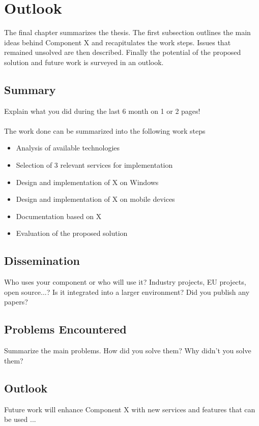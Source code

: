 \chapter{Outlook\label{cha:chapter7}}
The final chapter summarizes the thesis. The first subsection outlines the main ideas behind Component X and recapitulates the work steps. Issues that remained unsolved are then described. Finally the potential of the proposed solution and future work is surveyed in an outlook.

\section{Summary\label{sec:summary}}

Explain what you did during the last 6 month on 1 or 2 pages!
\\
\\
\noindent The work done can be summarized into the following work steps

\begin{itemize}
		\item Analysis of available technologies
		\vspace{-0.11in} 
		\item Selection of 3 relevant services for implementation
		\vspace{-0.11in} 
		\item Design and implementation of X on Windows
		\vspace{-0.11in} 
		\item Design and implementation of X on mobile devices
		\vspace{-0.11in} 
		\item Documentation based on X
		\vspace{-0.11in} 
		\item Evaluation of the proposed solution
\end{itemize}

\section{Dissemination\label{sec:dissemination}}

Who uses your component or who will use it? Industry projects, EU projects, open source...? Is it integrated into a larger environment? Did you publish any papers?

\section{Problems Encountered\label{sec:problems}}

Summarize the main problems. How did you solve them? Why didn't you solve them?

\section{Outlook\label{sec:outlook}}

Future work will enhance Component X with new services and features that can be used ...